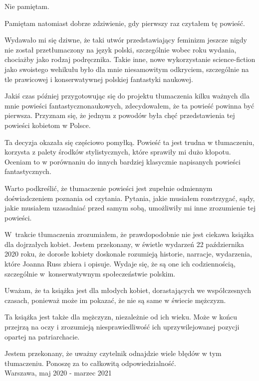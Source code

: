 \documentclass[oneside,polish,12pt,sfheadings]{mwbk}
\begin{document}
Nie pamiętam. 

Pamiętam natomiast dobrze zdziwienie, gdy pierwszy raz czytałem tę powieść.

Wydawało mi się dziwne, że taki utwór przedstawiający feminizm jeszcze nigdy nie został przetłumaczony na język polski, szczególnie wobec roku wydania, chociażby jako rodzaj podręcznika. Takie inne, nowe wykorzystanie science-fiction jako swoistego wehikułu było dla mnie niesamowitym odkryciem, szczególnie na tle prawicowej i konserwatywnej polskiej fantastyki naukowej.

Jakiś czas później przygotowując się do projektu tłumaczenia kilku ważnych dla mnie powieści fantastycznonaukowych, zdecydowałem, że ta powieść powinna być pierwsza. Przyznam się, że jednym z powodów była chęć przedstawienia tej powieści kobietom w Polsce. 

Ta decyzja okazała się częściowo pomyłką. Powieść ta jest trudna w tłumaczeniu, korzysta z palety środków stylistycznych, które sprawiły mi dużo kłopotu. Oceniam to w porównaniu do innych bardziej klasycznie napisanych powieści fantastycznych. 

Warto podkreślić, że tłumaczenie powieści jest zupełnie odmiennym doświadczeniem poznania od czytania. Pytania, jakie musiałem rozstrzygać, sądy, jakie musiałem uzasadniać przed samym sobą, umożliwiły mi inne zrozumienie tej powieści. 

W~trakcie tłumaczenia zrozumiałem, że prawdopodobnie nie jest ciekawa książka dla dojrzałych kobiet. Jestem przekonany, w świetle wydarzeń 22 października 2020 roku, że dorosłe kobiety doskonale rozumieją historie, narracje, wydarzenia, które Joanna Russ zbiera i opisuje. Wydaje się, że są one ich codziennością, szczególnie w~konserwatywnym społeczeństwie polskim.

Uważam, że ta książka jest dla młodych kobiet, dorastających we współczesnych czasach, ponieważ może im pokazać, że nie są same w świecie mężczyzn. 

Ta książka jest także dla mężczyzn, niezależnie od ich wieku. Może w końcu przejrzą na oczy i zrozumieją niesprawiedliwość ich uprzywilejowanej pozycji opartej na patriarchacie.

Jestem przekonany, że uważny czytelnik odnajdzie wiele błędów w tym tłumaczeniu. Ponoszę za to całkowitą odpowiedzialność. \\


Warszawa, maj 2020 - marzec 2021


\tableofcontents{}
\end{document}
